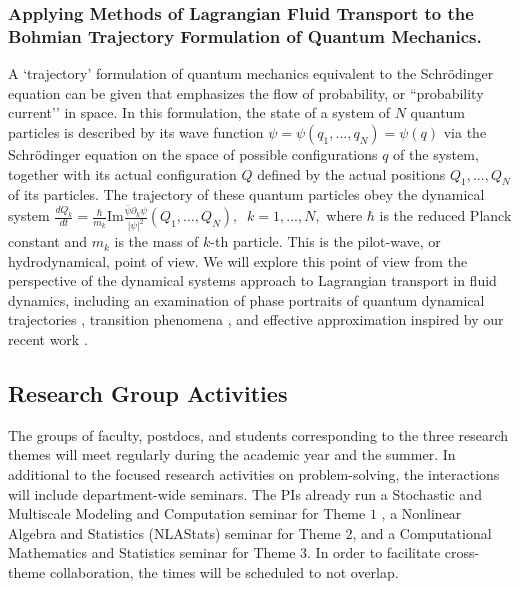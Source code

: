 \documentclass[11pt]{NSFamsart}
\begin{document}
\subsubsection*{Applying Methods of Lagrangian Fluid Transport to the Bohmian Trajectory Formulation of Quantum Mechanics.}   A `trajectory'  formulation of quantum mechanics  equivalent to the Schr\"{o}dinger equation can be given \cite{Bohmian, Holland1993TheQT} that emphasizes the flow of probability, or ``probability current’’ in space. 
In this formulation, the state of a system of $N$ quantum particles is described by its wave function $\psi=\psi(q_1,…,q_N)=\psi(q)$ via the Schr\"{o}dinger equation  on the space of possible configurations $q$ of the system, together with its actual configuration $Q$ defined by the actual positions $Q_1,...,Q_N$ of its particles. The trajectory of these quantum particles obey the dynamical system
$
\frac{dQ_k}{dt}= \frac{\hbar}{m_k} \text{Im} \frac{\bar\psi  \partial_k \psi}{|\psi|^2}(Q_1,…,Q_N),\;\; k=1, ..., N,  
$
where $\hbar$ is the reduced Planck constant and $m_k$ is the mass of $k$-th particle.
This is the pilot-wave, or hydrodynamical, point of view. We will explore this point of view from the perspective of the dynamical systems approach to Lagrangian transport in fluid dynamics, including an examination of phase portraits of quantum dynamical trajectories \cite{Berndl1995OnTG}, transition phenomena \cite{waalkens2007wigner,Micha2006QuantumDW, Dittrich2016}, and effective approximation inspired by our recent work \cite{Li2021BohmianTO}. 
\fi


\subsection{Research Group Activities}
The groups of faculty, postdocs, and students corresponding to the three research themes will meet regularly during the academic year and the summer. In additional to the focused research activities on problem-solving, the interactions will include department-wide seminars. The PIs already run a Stochastic and Multiscale Modeling and Computation seminar for Theme $1$ , a Nonlinear Algebra and Statistics (NLAStats) seminar for Theme $2$, and a Computational Mathematics and Statistics seminar for Theme $3$.
In order to facilitate cross-theme collaboration, the times will be scheduled to not overlap. 
\end{document}
